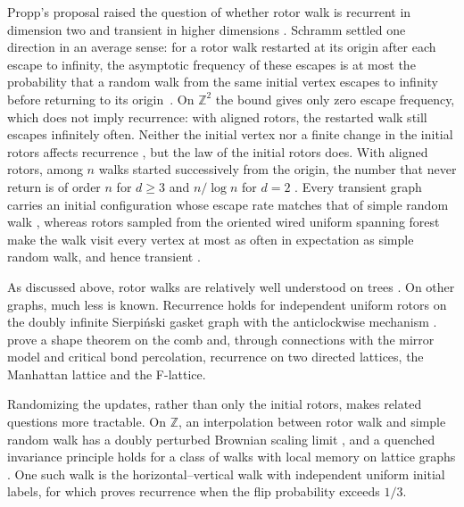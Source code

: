 \documentclass[11pt]{amsart}
\theoremstyle{plain}
\theoremstyle{definition}
\newcommand{\Z}{\mathbb Z}
\begin{document}
	Propp's proposal raised the question of whether rotor walk is recurrent in
	dimension two and transient in higher dimensions
	\citep[Section~1]{FlorescuGangulyLevinePeres2014}.  Schramm settled one
	direction in an average sense: for a rotor walk restarted at its origin after
	each escape to infinity, the asymptotic frequency of these  escapes is at most the probability that a random walk from the same initial vertex escapes to infinity before returning to its origin~\citep[Theorem~10]{HolroydPropp2010}.  On $\Z^2$ the bound gives only zero escape frequency, which does not imply recurrence: with aligned rotors, the restarted walk still escapes infinitely often.  Neither the initial vertex nor a
	finite change in the initial rotors affects recurrence
	\citep{AngelHolroyd2012}, but the law of the initial rotors does.  With aligned rotors, among
	$n$ walks started successively from the origin, the number that never return is
	of order $n$ for $d\geq3$ and $n/\log n$ for $d=2$
	\citep{FlorescuGangulyLevinePeres2014}.  Every transient graph carries an
	initial configuration whose escape rate matches that of simple random walk
	\citep{Chan2020}, whereas rotors sampled from the oriented wired uniform
	spanning forest make the walk visit every vertex at most as often in
	expectation as simple random walk, and hence transient \citep{Chan2019}.
	
	As discussed above, rotor walks are relatively well understood on trees
	\citep{AngelHolroyd2011,HussSava2012,HussMullerSavaHuss2015,
		HussSavaHuss2020Range,HussSavaHuss2020Periodic}.  On other graphs, much less is
	known.  Recurrence holds for independent uniform
	rotors on the doubly infinite Sierpi\'nski gasket graph with the anticlockwise
	mechanism \citep{KaiserSavaHuss2024}.  \citet{FlorescuLevinePeres2016} prove a
	shape theorem on the comb and, through connections with the mirror model and
	critical bond percolation, recurrence on two directed lattices, the Manhattan lattice and the
	F-lattice. 
	
	Randomizing the updates, rather than only the initial rotors, makes related
	questions more tractable.  On $\Z$, an interpolation between rotor walk and
	simple random walk has a doubly perturbed Brownian scaling limit
	\citep{HussLevineSavaHuss2018}, and a quenched invariance principle holds for
	a class of walks with local memory on lattice graphs
	\citep{ChanGrecoLevineLi2021}.  One such walk is the horizontal--vertical
	walk with independent uniform initial labels, for which \citet{Chan2023}
	proves recurrence when the flip probability exceeds $1/3$.
	
\end{document}
